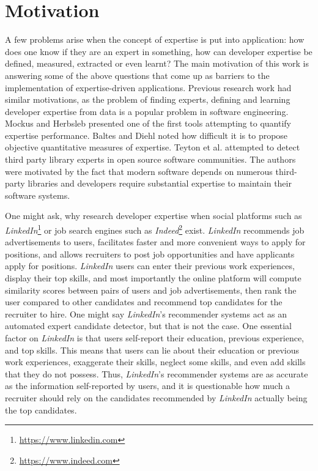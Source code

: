     \section{Motivation\label{sec:motivation}}
        A few problems arise when the concept of expertise is put into application: how does one know if they are an expert in something, how can developer expertise be defined, measured, extracted or even learnt? The main motivation of this work is answering some of the above questions that come up as barriers to the implementation of expertise-driven applications. Previous research work had similar motivations, as the problem of finding experts, defining and learning developer expertise from data is a popular problem in software engineering. Mockus and Herbsleb \cite{mockus2002expertise} presented one of the first tools attempting to quantify expertise performance. Baltes and Diehl \cite{baltes2018towards} noted how difficult it is to propose objective quantitative measures of expertise. Teyton et al. \cite{teyton2013find} attempted to detect third party library experts in open source software communities. The authors were motivated by the fact that modern software depends on numerous third-party libraries and developers require substantial expertise to maintain their software systems.
        
        \label{LinkedIn_flaws}One might ask, why research developer expertise when social platforms such as \emph{LinkedIn}\footnote{\url{https://www.linkedin.com}} or job search engines such as \emph{Indeed}\footnote{\url{https://www.indeed.com}} exist. \emph{LinkedIn} recommends job advertisements to users, facilitates faster and more convenient ways to apply for positions, and allows recruiters to post job opportunities and have applicants apply for positions. \emph{LinkedIn} users can enter their previous work experiences, display their top skills, and most importantly the online platform will compute similarity scores between pairs of users and job advertisements, then rank the user compared to other candidates and recommend top candidates for the recruiter to hire. One might say \emph{LinkedIn}'s recommender systems act as an automated expert candidate detector, but that is not the case. One essential factor on \emph{LinkedIn} is that users self-report their education, previous experience, and top skills. This means that users can lie about their education or previous work experiences, exaggerate their skills, neglect some skills, and even add skills that they do not possess. Thus, \emph{LinkedIn}'s recommender systems are as accurate as the information self-reported by users, and it is questionable how much a recruiter should rely on the candidates recommended by \emph{LinkedIn} actually being the top candidates.
        
